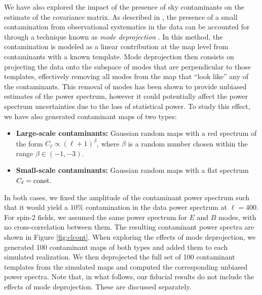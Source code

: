 \documentclass[a4paper,11pt]{article}
\begin{document}
      We have also explored the impact of the presence of sky contaminants on the estimate of the covariance matrix. As described in \cite{2019MNRAS.484.4127A}, the presence of a small contamination from observational systematics in the data can be accounted for through a technique known as {\sl mode deprojection} \cite{1992ApJ...398..169R,2004PhRvD..69l3003S,2017MNRAS.465.1847E}. In this method, the contamination is modeled as a linear contribution at the map level from contaminants with a known template. Mode deprojection then consists on projecting the data onto the subspace of modes that are perpendicular to those templates, effectively removing all modes from the map that ``look like'' any of the contaminants. This removal of modes has been shown to provide unbiased estimates of the power spectrum, however it could potentially affect the power spectrum uncertainties due to the loss of statistical power. To study this effect, we have also generated contaminant maps of two types:
      \begin{itemize}
        \item {\bf Large-scale contaminants:} Gaussian random maps with a red spectrum of the form $C_\ell\propto (\ell+1)^\beta$, where $\beta$ is a random number chosen within the range $\beta\in(-1,-3)$.
        \item {\bf Small-scale contaminants:} Gaussian random maps with a flat spectrum $C_\ell={\rm const.}$
      \end{itemize}
      In both cases, we fixed the amplitude of the contaminant power spectrum such that it would yield a $10\%$ contamination in the data power spectrum at $\ell=400$. For spin-2 fields, we assumed the same power spectrum for $E$ and $B$ modes, with no cross-correlation between them. The resulting contaminant power spectra are shown in Figure \ref{fig:clcont}. When exploring the effects of mode deprojection, we generated 100 contaminant maps of both types and added them to each simulated realization. We then deprojected the full set of 100 contaminant templates from the simulated maps and computed the corresponding unbiased power spectra. Note that, in what follows, our fiducial results do not include the effects of mode deprojection. These are discussed separately.
\end{document}
